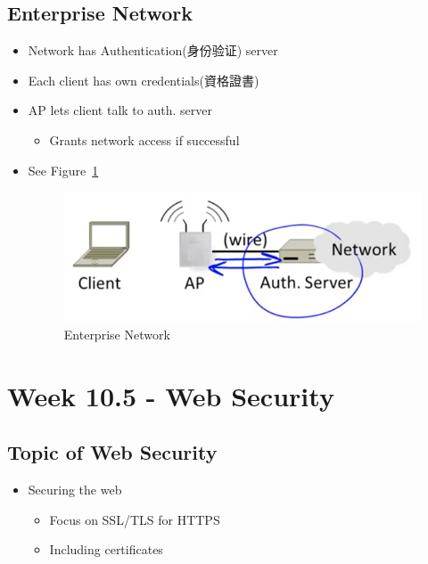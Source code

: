 \documentclass[12pt]{ctexart}   %
\begin{document}
	\subsection{Enterprise Network}
	\begin{itemize}
		\item Network has Authentication(身份验证) server
		\item Each client has own credentials(資格證書)
		\item AP lets client talk to auth. server
		\begin{itemize}
			\item Grants network access if successful
		\end{itemize}
		\item See Figure~\ref{fig:10-4-6}
		  
		\begin{figure}[h!] %
		\centering
		\includegraphics[scale=0.7]{images/10-4-6}
		\caption{Enterprise Network}
		\label{fig:10-4-6}
		\end{figure}
	\end{itemize}

\section{Week 10.5 - Web Security}
	\subsection{Topic of Web Security}
	\begin{itemize}
		\item Securing the web
		\begin{itemize}
			\item Focus on SSL/TLS for HTTPS
			\item Including certificates
		\end{itemize}
	\end{itemize}
\end{document}
